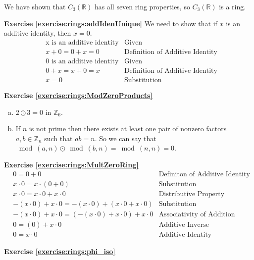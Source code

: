 We have shown that $C_3({\mathbb R})$ has all seven ring properties, so $C_3({\mathbb R})$ is a ring.



\noindent\textbf{Exercise \ref{exercise:rings:addIdenUnique}}
We need to show that if $x$ is an additive identity, then $x=0$.
\begin{align*}
&\text{x is an additive identity} & \text{Given}\\
&x+0=0+x=0 & \text{Definition of Additive Identity}\\
&\text{0 is an additive identity} & \text{Given}\\  
&0+x=x+0=x & \text{Definition of Additive Identity} \\
&x=0 & \text{Substitution}
\end{align*}

\noindent\textbf{Exercise \ref{exercise:rings:ModZeroProducts}}
\begin{enumerate}[(a)]
    \item $2\odot 3=0$ in ${\mathbb Z}_6$.
    \item If $n$ is not prime then there exists at least one pair of nonzero factors $a,b\in{\mathbb Z}_n$ such that $ab=n$.  So we can say that $\bmod(a,n)\odot\bmod(b,n)=\bmod(n,n)=0$.
\end{enumerate}

\noindent\textbf{Exercise \ref{exercise:rings:MultZeroRing}}
\begin{align*}
&0=0+0 & \text{Definiton of Additive Identity}\\
&x\cdot0=x\cdot(0+0) & \text{Substitution}\\
&x\cdot0=x\cdot0+x\cdot0 & \text{Distributive Property}\\
&-(x\cdot 0)+x\cdot0=-(x\cdot 0)+(x\cdot0+x\cdot0) & \text{Substitution}\\
&-(x\cdot0)+x\cdot0=(-(x\cdot 0)+x\cdot0)+x\cdot0 & \text{Associativity of Addition}\\
&0=(0)+x\cdot0 & \text{Additive Inverse}\\
&0=x\cdot 0 & \text{Additive Identity}
\end{align*}


\noindent\textbf{Exercise \ref{exercise:rings:phi_iso}}







